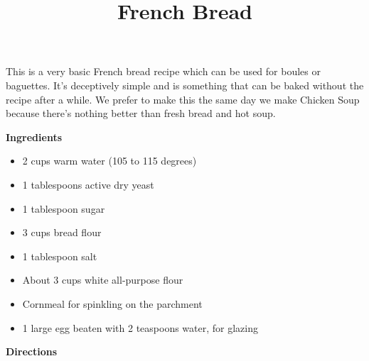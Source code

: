 \documentclass{article}
\title{French Bread}
\begin{document}
This is a very basic French bread recipe which can be used for boules or baguettes. It's
deceptively simple and is something that can be baked without the recipe after a while. We
prefer to make this the same day we make Chicken Soup because there's nothing better than
fresh bread and hot soup.

\bigskip

\textbf{Ingredients}

\begin{multicols}{2}
      \begin{itemize}
            \item 2 cups warm water (105 to 115 degrees)
            \item 1 tablespoons active dry yeast
            \item 1 tablespoon sugar
            \item 3 cups bread flour
            \item 1 tablespoon salt
            \item About 3 cups white all-purpose flour
            \item Cornmeal for spinkling on the parchment
            \item 1 large egg beaten with 2 teaspoons water, for glazing
      \end{itemize}
\end{multicols}

\textbf{Directions}
\end{document}
